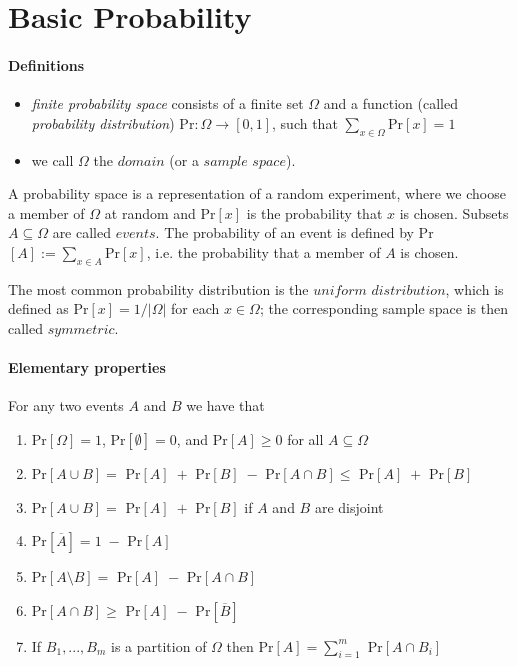 \section{Basic Probability}

\paragraph{Definitions}
\begin{itemize}
    \item \textit{finite probability space} consists of a finite
    set $ \Omega $ and a function (called \textit{probability distribution})
    Pr$: \Omega \to [0,1] $, such that $ \sum_{x \in \Omega} \text{Pr}[x] = 1 $
    \item we call $\Omega$ the $domain$ (or a $sample$ $space$).
\end{itemize}
A probability space is a representation of a random experiment, where
we choose a member of $ \Omega $ at random and Pr$[x]$ is the 
probability that $ x $ is chosen. Subsets $ A \subseteq \Omega $ 
are called $events$. The probability of an event is defined by 
Pr$[A] := \sum_{x\in A} \text{Pr}[x]$, i.e. the probability that 
a member of $ A $ is chosen. 

\smallskip
The most common probability distribution is the $uniform$ $distribution$,
which is defined as Pr$[x] = 1/|\Omega|$ for each $ x \in \Omega$; the 
corresponding sample space is then called $symmetric$.

\paragraph{Elementary properties} For any two events $ A $ and $ B $ 
we have that 
\begin{enumerate}
    \item Pr$[\Omega] = 1$, Pr$[\emptyset] = 0$, and Pr$[A] \geq 0$ 
    for all $A \subseteq \Omega$
    \item Pr$[A \cup B] =$ Pr$[A] \;+ $ Pr$[B] \;-$ Pr$[A \cap B] \leq
    $ Pr$[A] \;+ $ Pr$[B]$
    \item Pr$[A \cup B] =$ Pr$[A] \;+ $ Pr$[B]$ if $ A $ and $ B $ 
    are disjoint 
    \item Pr$[\overline{A}] = 1 \; - $ Pr$[A]$
    \item Pr$[A \setminus B] = $ Pr$[A] \; -$ Pr$[A \cap B]$
    \item Pr$[A \cap B] \geq $ Pr$[A] \; - $ Pr$[\overline{B}]$
    \item If $ B_1,...,B_m $ is a partition of $ \Omega $ then 
    Pr$[A] = \sum_{i = 1}^m$ Pr$[A \cap B_i] $
\end{enumerate}

